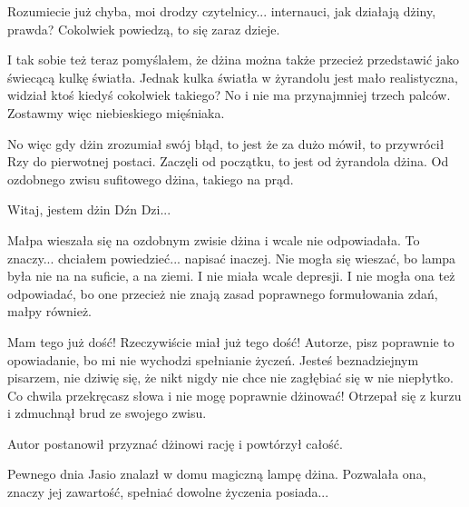 Rozumiecie już chyba, moi drodzy czytelnicy... internauci, jak działają dżiny, prawda? 
Cokolwiek powiedzą, to się zaraz dzieje.

I tak sobie też teraz pomyślałem, że dżina można także przecież przedstawić jako świecącą kulkę światła. 
Jednak kulka światła w żyrandolu jest mało realistyczna, widział ktoś kiedyś cokolwiek takiego?
No i nie ma przynajmniej trzech palców.
Zostawmy więc niebieskiego mięśniaka.

No więc gdy dżin zrozumiał swój błąd, to jest że za dużo mówił, to przywrócił Rzy do pierwotnej postaci.
Zaczęli od początku, to jest od żyrandola dżina. 
Od ozdobnego zwisu sufitowego dżina, takiego na prąd.

\begin{dialogue}
	\ds{} Witaj, jestem dżin Dźn Dzi...
\end{dialogue}
Małpa wieszała się na ozdobnym zwisie dżina i wcale nie odpowiadała.
To znaczy... chciałem powiedzieć... napisać inaczej. 
Nie mogła się wieszać, bo lampa była nie na na suficie, a na ziemi. I nie miała wcale depresji.
I nie mogła ona też odpowiadać, bo one przecież nie znają zasad poprawnego formułowania zdań, małpy również.

\begin{dialogue}
	\ds{} Mam tego już dość! \dm{} Rzeczywiście miał już tego dość! \dm{} Autorze, pisz poprawnie to opowiadanie, bo mi nie wychodzi spełnianie życzeń. 
	Jesteś beznadziejnym pisarzem, nie dziwię się, że nikt nigdy nie chce nie zagłębiać się w nie niepłytko.
	Co chwila przekręcasz słowa i nie mogę poprawnie dżinować! Otrzepał się z kurzu i zdmuchnął brud ze swojego zwisu.
\end{dialogue}

Autor postanowił przyznać dżinowi rację i powtórzył całość.

\bigskip
	
Pewnego dnia Jasio znalazł w domu magiczną lampę dżina.
Pozwalała ona, znaczy jej zawartość, spełniać dowolne życzenia posiada...

